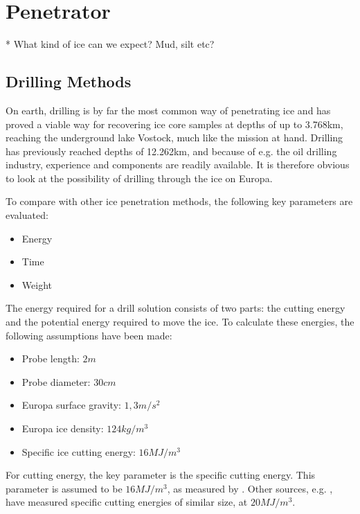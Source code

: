 \chapter{Penetrator}

* What kind of ice can we expect? Mud, silt etc?

\section{Drilling Methods}

On earth, drilling is by far the most common way of penetrating ice and has proved a viable way for recovering ice core samples at depths of up to 3.768km, reaching the underground lake Vostock, much like the mission at hand. Drilling has previously reached depths of 12.262km, and because of e.g. the oil drilling industry, experience and components are readily available. It is therefore obvious to look at the possibility of drilling through the ice on Europa.

To compare with other ice penetration methods, the following key parameters are evaluated:
\begin{itemize}
    \item Energy
	\item Time
	\item Weight
\end{itemize}
The energy required for a drill solution consists of two parts: the cutting energy and the potential energy required to move the ice. To calculate these energies, the following assumptions have been made:
\begin{itemize}
	\item Probe length:   $2m$
	\item Probe diameter:   $30cm$
	\item Europa surface gravity:   $1,3m/s^2$
	\item Europa ice density:   $124kg/m^3$
	\item Specific ice cutting energy:   $16MJ/m^3$
\end{itemize}
For cutting energy, the key parameter is the specific cutting energy. This parameter is assumed to be $16MJ/m^3$, as measured by \cite{icecore}. Other sources, e.g. \cite{extremeenvironments}, have measured specific cutting energies of similar size, at $20MJ/m^3$.


